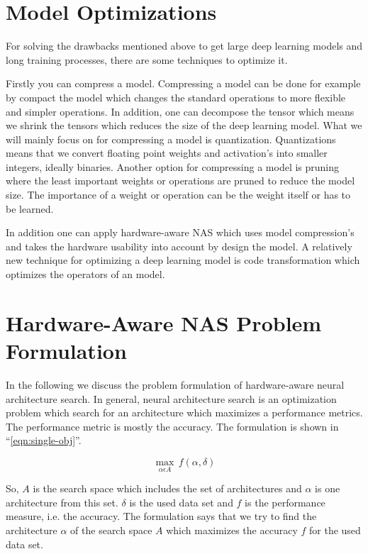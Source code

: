 \documentclass[conference]{IEEEtran}
\begin{document}
\section{Model Optimizations}
For solving the drawbacks mentioned above  to get large deep learning models and long training processes, there are some techniques to optimize it.

Firstly you can compress a model. Compressing a model can be done for example by compact the model which changes the standard operations to more flexible and simpler operations. In addition, one can decompose the tensor which means we shrink the tensors which reduces the size of the deep learning model. What we will mainly focus on for compressing a model is quantization. Quantizations means that we convert floating point weights and activation's into smaller integers, ideally binaries. Another option for compressing a model is pruning where the least important weights or operations are pruned to reduce the model size. The importance of a weight or operation can be the weight itself or has to be learned. 

In addition one can apply hardware-aware NAS which uses model compression's and takes the hardware usability into account by design the model. A relatively new technique for optimizing a deep learning model is code transformation which optimizes the operators of an model.

\section{Hardware-Aware NAS Problem Formulation}
In the following we discuss the problem formulation of hardware-aware neural architecture search. In general, neural architecture search is an optimization problem which search for an architecture which maximizes a performance metrics. The performance metric is mostly the accuracy. The formulation is shown in ``\eqref{eqn:single-obj}''. 
 
\begin{equation}
\label{eqn:single-obj}
\max_{\alpha\epsilon A}\,f(\alpha, \delta)
\end{equation}

So, $A$ is the search space which includes the set of architectures and $\alpha$ is one architecture from this set. $\delta$ is the used data set and $f$ is the performance measure, i.e. the accuracy.  The formulation says that we try to find the architecture $\alpha$ of the search space $A$ which maximizes the accuracy $f$ for the used data set. 
 
\end{document}
